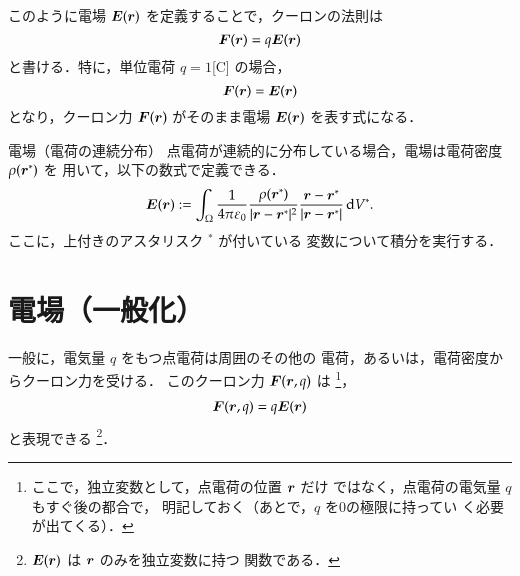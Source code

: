             このように電場 $\boldsymbol{E}(\boldsymbol{r})$ を定義することで，クーロンの法則は
                \begin{equation*}
                    \boldsymbol{F}(\boldsymbol{r}) = q \boldsymbol{E}(\boldsymbol{r})
                \end{equation*}
            と書ける．特に，単位電荷 $q=1$[C] の場合，
                \begin{equation*}
                    \boldsymbol{F}(\boldsymbol{r}) = \boldsymbol{E}(\boldsymbol{r})
                \end{equation*}
            となり，クーロン力 $\boldsymbol{F}(\boldsymbol{r})$ がそのまま電場 $\boldsymbol{E}(\boldsymbol{r})$ を表す式になる．
                \begin{myshadebox}{電場（電荷の連続分布）}
                    点電荷が連続的に分布している場合，電場は電荷密度 $\rho(\boldsymbol{r}^{*})$ を
                    用いて，以下の数式で定義できる．
                    \begin{align}\label{denba}
                        \bE(\br)
                        :=\int_\Omega \frac{1}{4\pi\varepsilon_{0}}
                        \frac{\rho(\br^{*})}{|\br-\br^{*}|^{2}}
                        \frac{\br-\br^{*}}
                        {|\br-\br^{*}|}\df V^{*}.
                    \end{align}
                    ここに，上付きのアスタリスク ${}^{*}$ が付いている
                    変数について積分を実行する．
                \end{myshadebox}


            \section{電場（一般化）}
            一般に，電気量 $q$ をもつ点電荷は周囲のその他の
            電荷，あるいは，電荷密度からクーロン力を受ける．
            このクーロン力 $\boldsymbol{F}(\boldsymbol{r},q)$ は
                \footnote{
                    ここで，独立変数として，点電荷の位置 $\boldsymbol{r}$ だけ
                    ではなく，点電荷の電気量 $q$ もすぐ後の都合で，
                    明記しておく（あとで，$q$ を0の極限に持ってい
                    く必要が出てくる）．
                }，
                \begin{align*}
                    \boldsymbol{F}(\boldsymbol{r},q)=q\boldsymbol{E}(\boldsymbol{r})
                \end{align*}
            と表現できる
                \footnote{
                    $\boldsymbol{E}(\boldsymbol{r})$ は $\boldsymbol{r}$ のみを独立変数に持つ
                    関数である．
                }．

